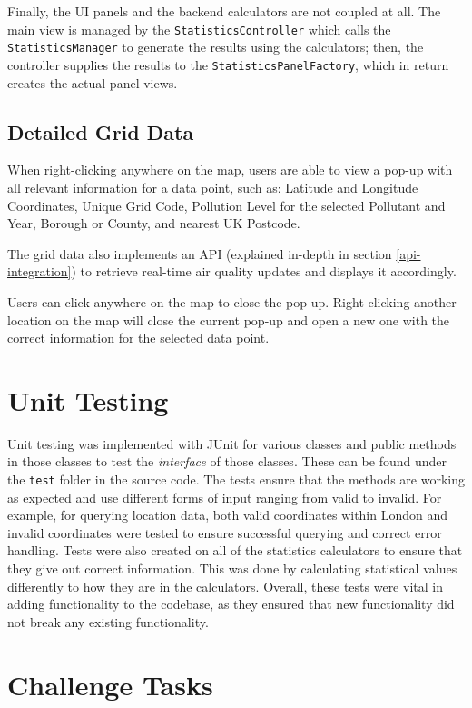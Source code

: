 \documentclass[10pt, a4paper]{scrartcl}
\begin{document}
\begin{multicols}{2}
\noindent Finally, the UI panels and the backend calculators are not coupled at all. The main view is managed by the
\verb|StatisticsController| which calls the \verb|StatisticsManager| to generate the results using the calculators; then,
the controller supplies the results to the \verb|StatisticsPanelFactory|, which in return creates the actual panel views.

\subsection{Detailed Grid Data}

\noindent When right-clicking anywhere on the map, users are able to view a pop-up with all relevant information for a data
point, such as: Latitude and Longitude Coordinates, Unique Grid Code, Pollution Level for the selected Pollutant and Year,
Borough or County, and nearest UK Postcode. 
    
\noindent The grid data also implements an API (explained in-depth in section \ref{api-integration}) to retrieve real-time
air quality updates and displays it accordingly.
    
\noindent Users can click anywhere on the map to close the pop-up. Right clicking another location on the map will
close the current pop-up and open a new one with the correct information for the selected data point.

\section{Unit Testing}

\noindent Unit testing was implemented with JUnit for various classes and public methods in those classes to test the
\textit{interface} of those classes. These can be found under the \verb|test| folder in the source code.
The tests ensure that the methods are working as expected and use different forms
of input ranging from valid to invalid. For example, for querying location data, both valid coordinates within London
and invalid coordinates were tested to ensure successful querying and correct error handling. Tests were also created
on all of the statistics calculators to ensure that they give out correct information. This was done by calculating statistical
values differently to how they are in the calculators. Overall, these tests were vital in adding functionality to the codebase,
as they ensured that new functionality did not break any existing functionality.

\section{Challenge Tasks} \label{challenge-tasks}


\end{multicols}
\end{document}
